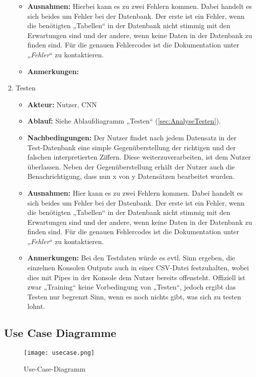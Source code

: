 \begin{enumerate}
\begin{itemize}
		\item \textbf{Ausnahmen:} Hierbei kann es zu zwei Fehlern kommen. Dabei handelt es sich beides um Fehler bei der Datenbank. Der erste ist ein Fehler, wenn die benötigten „Tabellen“ in der Datenbank nicht stimmig mit den Erwartungen sind und der andere, wenn keine Daten in der Datenbank zu finden sind. Für die genauen Fehlercodes ist die Dokumentation unter „\textit{Fehler}“ zu kontaktieren.
		\item \textbf{Anmerkungen:}
	\end{itemize}
	\item Testen
	\begin{itemize}
		\item \textbf{Akteur:} Nutzer, CNN
		\item \textbf{Ablauf:} Siehe Ablaufdiagramm „Testen“ (\ref{sec:AnalyseTesten}).
		\item \textbf{Nachbedingungen:} Der Nutzer findet nach jedem Datensatz in der Test-Datenbank eine simple Gegenüberstellung der richtigen und der falschen interpretierten Ziffern. Diese weiterzuverarbeiten, ist dem Nutzer überlassen. Neben der Gegenüberstellung erhält der Nutzer auch die Benachrichtigung, dass nun x von y Datensätzen bearbeitet wurden.
		\item \textbf{Ausnahmen:} Hier kann es zu zwei Fehlern kommen. Dabei handelt es sich beides um Fehler bei der Datenbank. Der erste ist ein Fehler, wenn die benötigten „Tabellen“ in der Datenbank nicht stimmig mit den Erwartungen sind und der andere, wenn keine Daten in der Datenbank zu finden sind. Für die genauen Fehlercodes ist die Dokumentation unter „\textit{Fehler}“ zu kontaktieren.
		\item \textbf{Anmerkungen:} Bei den Testdaten würde es evtl. Sinn ergeben, die einzelnen Konsolen Outputs auch in einer CSV-Datei festzuhalten, wobei dies mit Pipes in der Konsole dem Nutzer bereits offensteht. Offiziell ist zwar „Training“ keine Vorbedingung von „Testen“, jedoch ergibt das Testen nur begrenzt Sinn, wenn es noch nichts gibt, was sich zu testen lohnt.
	\end{itemize}
\end{enumerate}

\subsection{Use Case Diagramme}
\label{sec:AnalyseUseCaseDiagramme}
\begin{figure}[H]
	\centering
	\texttt{[image: usecase.png]}
	\caption{Use-Case-Diagramm}
	\label{fig:analyseusecase}
\end{figure}

